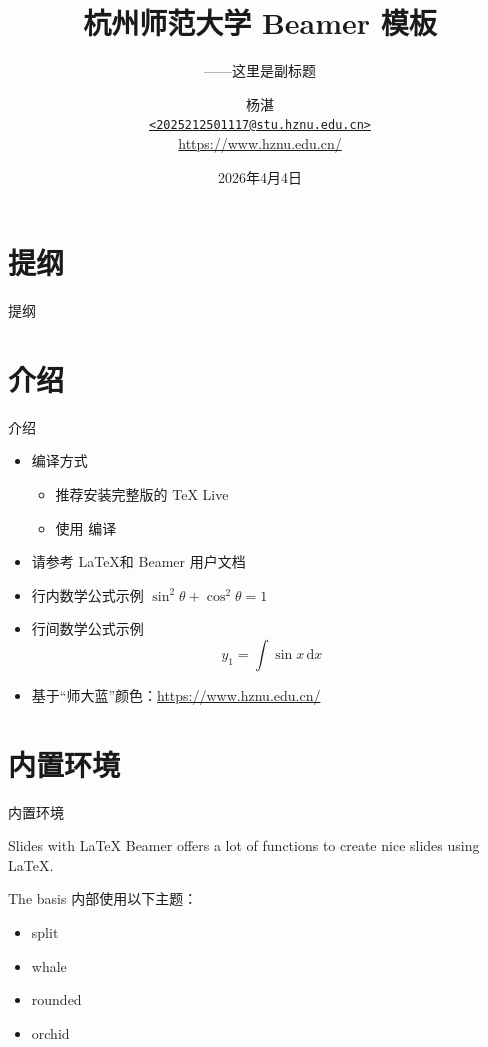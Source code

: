 \documentclass[10pt,aspectratio=169]{beamer}
\title[杭州师范大学 Beamer 模板]{杭州师范大学 Beamer 模板}
\subtitle{——这里是副标题}
\author[Yeung Zhaam]{%
  \texorpdfstring{%
    杨湛 \\\medskip
    {\small
      \href{mailto:2025212501117@stu.hznu.edu.cn}
        {\nolinkurl{<2025212501117@stu.hznu.edu.cn>}}%
    } \\
    {\small \url{https://www.hznu.edu.cn/}}%
  }{杨湛}%
}
\institute[数学学院]{%
  数学学院 \\
  杭州师范大学%
}
\date[Apr. 4, 2026]{2026年4月4日}
\begin{document}
\begin{frame}[plain]
  \titlepage
\end{frame}

\section{提纲}
\begin{frame}{提纲}
  \tableofcontents
\end{frame}

\section{介绍}
\begin{frame}{介绍}
  \begin{itemize}
    \item 编译方式
      \begin{itemize}
        \item 推荐安装完整版的 TeX Live
        \item 使用 \XeLaTeX 编译
      \end{itemize}
    \item 请参考 \LaTeX 和 Beamer 用户文档
    \item 行内数学公式示例 $\sin^2 \theta + \cos^2 \theta = 1$
    \item 行间数学公式示例
      \begin{equation}
        y_1 = \int \sin x\, \mathrm{d}x
      \end{equation}
    \item 基于“师大蓝”颜色：\url{https://www.hznu.edu.cn/}
  \end{itemize}
\end{frame}

\section{内置环境}
\begin{frame}{内置环境}
  \begin{block}{Slides with \LaTeX}
    Beamer offers a lot of functions to create nice slides using \LaTeX.
  \end{block}

  \begin{block}{The basis}
    内部使用以下主题：
    \begin{itemize}
      \item split
      \item whale
      \item rounded
      \item orchid
    \end{itemize}
  \end{block}
\end{frame}
\end{document}

